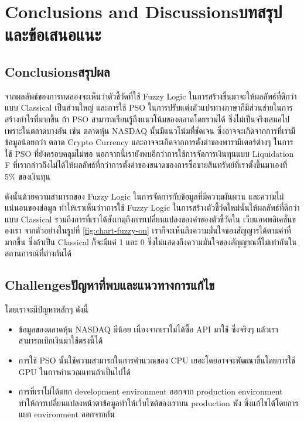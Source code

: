 \chapter{\ifenglish Conclusions and Discussions\else บทสรุปและข้อเสนอแนะ\fi}

\section{\ifenglish Conclusions\else สรุปผล\fi}


จากผลลัพธ์ของการทดลองจะเห็นว่าตัวชี้วัดที่ใช้ Fuzzy Logic ในการสร้างขึ้นมาจะให้ผลลัพธ์ที่ดีกว่าแบบ Classical เป็นส่วนใหญ่ และการใช้ PSO ในการปรับแต่งตัวแปรทางภาษาก็มีส่วนช่ายในการสร้างกำไรที่มากขึ้น ถ้า PSO สามารถเรียนรู้ถึงแนวโน้มของตลาดโดยรวมได้ ซึ่งไม่เป็นจริงเสมอไป เพราะในตลาดบางอัน เช่น ตลาดหุ้น NASDAQ นั้นมีแนวโน้มที่ชัดเจน ซึ่งอาจจะเกิดจากการที่เรามีข้อมูลน้อยกว่า ตลาด Crypto Currency และอาจจะเกิดจากการตั้งต่าของพารามิเตอร์ต่างๆ ในการใช้ PSO ที่ยังครอบคลุมไม่พอ นอกจากนี้เรายังพบอีกว่าการใช้การจัดการเงินทุนแบบ Liquidation F ที่เรากล่าวถึงไม่ได้ให้ผลลัพธ์ที่กว่าการตั้งค่าของขนาดของการซื้อขายสินทรัพย์ที่เราตั้งขึ้นมาเองที่ 5\% ของเงินทุน 

ดังนั้นด้วยความสามารถของ Fuzzy Logic ในการจัดการกับข้อมูลที่มีความผันผวน และความไม่แน่นอนของข่อมูล ทำให้เราเห็นว่าาการใช้ Fuzzy
Logic ในการสร้างตัวชี้วัดใหม่นั้นให้ผลลัพธ์ที่ดีกว่าแบบ Classical รวมถึงการที่เราได้สังเกตุถึงการเปลี่ยนแปลงของค่าของตัวชี้วัดใน เว็บแอพพลิเคชั่นของเรา จากตัวอย่างในรูปที่ \ref{fig:chart-fuzzy-on} เราก็จะเห็นถึงความมั่นใจของสัญญารได้ตามค่าที่มากขึ้น ซึ่งถ้าเป็น Classical ก็จะมีแค่ 1 และ 0 ซึ่งไม่แสดงถึงความมั่นใจของสัญญาณที่ไม่เท่ากันในสถานการณ์ที่ต่างกันได้

\section{\ifenglish Challenges\else ปัญหาที่พบและแนวทางการแก้ไข\fi}
โดยเราจะมีปํญหาหลักๆ ดังนี้
\begin{itemize}
    \item ข้อมูลของตลาดหุ้น NASDAQ มีน้อย เนื่องจากเราไม่ได้ซื้อ API มาใช้ ซึ่งจริงๆ แล้วเราสามารถเบิกเงินมาใช้ตรงนี้ได้
    \item การใช้ PSO นั้นใช้ความสามารถในการคำนวณของ CPU เยอะโดยอาจจะพัฒณาขึ้นโดยการใช้ GPU ในการคำนวณแทนถ้าเป็นไปได้
    \item การที่เราไม่ได้แยก development environment ออกจาก production environment ทำให้การเปลี่ยนแปลงหน้าตาข้อมูลทำให้เว็บไซต์ของเราบน production พัง ซึ่งแก้ไขได้โดยการแยก environment ออกจากกัน
\end{itemize}

